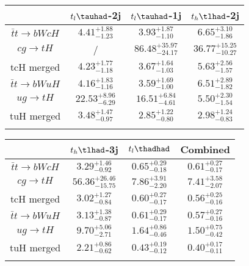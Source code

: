 \centering
\begin{tabular}{cccc} \toprule\toprule
 & $t_l\tauhad$-2j & $t_l\tauhad$-1j & $t_h\tlhad$-2j\\\midrule
$\bar{t}t\to bWcH$ & $4.41^{+1.88}_{-1.23}$ & $3.93^{+1.87}_{-1.10}$ & $6.65^{+3.10}_{-1.86}$\\
$cg\to tH$ &  / & $86.48^{+35.97}_{-24.17}$ & $36.77^{+15.25}_{-10.27}$\\
tcH merged & $4.23^{+1.77}_{-1.18}$ & $3.67^{+1.64}_{-1.03}$ & $5.63^{+2.56}_{-1.57}$\\
$\bar{t}t\to bWuH$ & $4.16^{+1.83}_{-1.16}$ & $3.59^{+1.69}_{-1.00}$ & $6.51^{+2.89}_{-1.82}$\\
$ug\to tH$ & $22.53^{+8.96}_{-6.29}$ & $16.51^{+6.84}_{-4.61}$ & $5.50^{+2.30}_{-1.54}$\\
tuH merged & $3.48^{+1.47}_{-0.97}$ & $2.85^{+1.22}_{-0.80}$ & $2.98^{+1.24}_{-0.83}$\\
\bottomrule\bottomrule\\
\end{tabular}
\begin{tabular}{cccc} \toprule\toprule
 & $t_h\tlhad$-3j & $t_l\thadhad$ & Combined\\\midrule
$\bar{t}t\to bWcH$ & $3.29^{+1.46}_{-0.92}$ & $0.65^{+0.29}_{-0.18}$ & $0.61^{+0.27}_{-0.17}$\\
$cg\to tH$ & $56.36^{+26.46}_{-15.75}$ & $7.86^{+3.91}_{-2.20}$ & $7.41^{+3.58}_{-2.07}$\\
tcH merged & $3.02^{+1.27}_{-0.84}$ & $0.60^{+0.27}_{-0.17}$ & $0.56^{+0.25}_{-0.16}$\\
$\bar{t}t\to bWuH$ & $3.13^{+1.38}_{-0.87}$ & $0.61^{+0.29}_{-0.17}$ & $0.57^{+0.27}_{-0.16}$\\
$ug\to tH$ & $9.70^{+5.06}_{-2.71}$ & $1.64^{+0.86}_{-0.46}$ & $1.50^{+0.75}_{-0.42}$\\
tuH merged & $2.21^{+0.86}_{-0.62}$ & $0.43^{+0.19}_{-0.12}$ & $0.40^{+0.17}_{-0.11}$\\
\bottomrule\bottomrule\\
\end{tabular}
